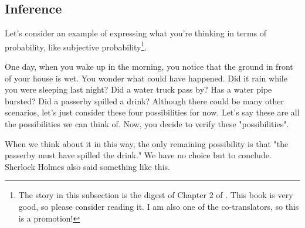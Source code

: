


\subsection{Inference}
Let's consider an example of expressing what you're thinking in terms of probability, like subjective probability\footnote{The story in this subsection is the digest of Chapter 2 of \textcite{Maeda2017}. This book is very good, so please consider reading it. I am also one of the co-translators, so this is a promotion!}.

One day, when you wake up in the morning, you notice that the ground in front of your house is wet. You wonder what could have happened. Did it rain while you were sleeping last night? Did a water truck pass by? Has a water pipe bursted? Did a passerby spilled a drink? Although there could be many other scenarios, let's just consider these four possibilities for now. Let's say these are all the possibilities we can think of. Now, you decide to verify these "possibilities".

When we think about it in this way, the only remaining possibility is that "the passerby must have spilled the drink." We have no choice but to conclude. Sherlock Holmes also said something like this.



